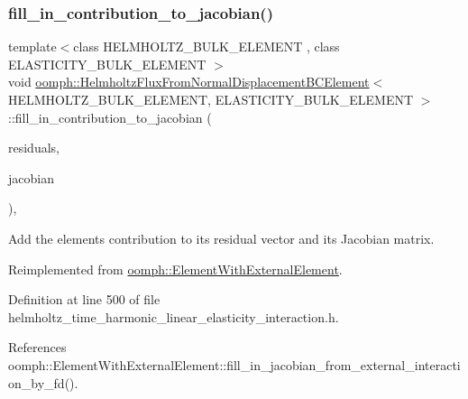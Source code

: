 \subsubsection{\texorpdfstring{fill\+\_\+in\+\_\+contribution\+\_\+to\+\_\+jacobian()}{fill\_in\_contribution\_to\_jacobian()}}
{\footnotesize\ttfamily template$<$class H\+E\+L\+M\+H\+O\+L\+T\+Z\+\_\+\+B\+U\+L\+K\+\_\+\+E\+L\+E\+M\+E\+NT , class E\+L\+A\+S\+T\+I\+C\+I\+T\+Y\+\_\+\+B\+U\+L\+K\+\_\+\+E\+L\+E\+M\+E\+NT $>$ \\
void \hyperlink{classoomph_1_1HelmholtzFluxFromNormalDisplacementBCElement}{oomph\+::\+Helmholtz\+Flux\+From\+Normal\+Displacement\+B\+C\+Element}$<$ H\+E\+L\+M\+H\+O\+L\+T\+Z\+\_\+\+B\+U\+L\+K\+\_\+\+E\+L\+E\+M\+E\+NT, E\+L\+A\+S\+T\+I\+C\+I\+T\+Y\+\_\+\+B\+U\+L\+K\+\_\+\+E\+L\+E\+M\+E\+NT $>$\+::fill\+\_\+in\+\_\+contribution\+\_\+to\+\_\+jacobian (\begin{DoxyParamCaption}\item[{\hyperlink{classoomph_1_1Vector}{Vector}$<$ double $>$ \&}]{residuals,  }\item[{\hyperlink{classoomph_1_1DenseMatrix}{Dense\+Matrix}$<$ double $>$ \&}]{jacobian }\end{DoxyParamCaption})\hspace{0.3cm}{\ttfamily [inline]}, {\ttfamily [virtual]}}



Add the element\textquotesingle{}s contribution to its residual vector and its Jacobian matrix. 



Reimplemented from \hyperlink{classoomph_1_1ElementWithExternalElement_ae5fb09552a8271e891438f8d058ca1b8}{oomph\+::\+Element\+With\+External\+Element}.



Definition at line 500 of file helmholtz\+\_\+time\+\_\+harmonic\+\_\+linear\+\_\+elasticity\+\_\+interaction.\+h.



References oomph\+::\+Element\+With\+External\+Element\+::fill\+\_\+in\+\_\+jacobian\+\_\+from\+\_\+external\+\_\+interaction\+\_\+by\+\_\+fd().

\mbox{\label{classoomph_1_1HelmholtzFluxFromNormalDisplacementBCElement_aab5bbb5d7c84d2aa0a5d9112e6f2d914}} 
